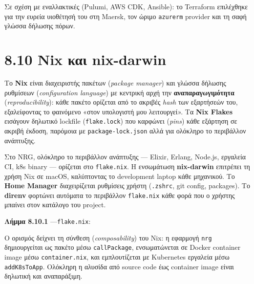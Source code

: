 Σε σχέση με εναλλακτικές (Pulumi, AWS CDK, Ansible): το Terraform
επιλέχθηκε για την ευρεία υιοθέτησή του στη Maersk, τον ώριμο
\texttt{azurerm} provider και τη σαφή γλώσσα δήλωσης πόρων.

\section{8.10 Nix και nix-darwin}\label{nix-ux3baux3b1ux3b9-nix-darwin}

Το \textbf{Nix} είναι διαχειριστής πακέτων (\emph{package manager}) και
γλώσσα δήλωσης ρυθμίσεων (\emph{configuration language}) με κεντρική
αρχή την \textbf{αναπαραγωγιμότητα} (\emph{reproducibility}): κάθε
πακέτο ορίζεται από το ακριβές \emph{hash} των εξαρτήσεών του,
εξαλείφοντας το φαινόμενο «στον υπολογιστή μου λειτουργεί». Τα
\textbf{Nix Flakes} εισάγουν δηλωτικό lockfile (\texttt{flake.lock}) που
καρφώνει (\emph{pins}) κάθε εξάρτηση σε ακριβή έκδοση, παρόμοια με
\texttt{package-lock.json} αλλά για ολόκληρο το περιβάλλον ανάπτυξης.

Στο NRG, ολόκληρο το περιβάλλον ανάπτυξης --- Elixir, Erlang, Node.js,
εργαλεία CI, k8s binary --- ορίζεται στο \texttt{flake.nix}. Η
ενσωμάτωση \textbf{nix-darwin} επιτρέπει τη χρήση Nix σε macOS,
καλύπτοντας το development laptop κάθε μηχανικού. Το \textbf{Home
Manager} διαχειρίζεται ρυθμίσεις χρήστη (\texttt{.zshrc}, git config,
packages). Το \textbf{direnv} φορτώνει αυτόματα το περιβάλλον
\texttt{flake.nix} κάθε φορά που ο χρήστης μπαίνει στον κατάλογο του
project.

\textbf{Λήμμα 8.10.1} ---\texttt{flake.nix}:

\begin{Shaded}
\begin{Highlighting}[]
\OperatorTok{\{}
   \OperatorTok{=} \OperatorTok{\{} \OperatorTok{\};}
   \OperatorTok{=} \OperatorTok{(}\OperatorTok{)} \OperatorTok{\{}
     \OperatorTok{=} \OperatorTok{[}\OperatorTok{];}
  \OperatorTok{\};}
\OperatorTok{\}}\NormalTok{;}
\end{Highlighting}
\end{Shaded}

Ο ορισμός δείχνει τη σύνθεση (\emph{composability}) του Nix: η εφαρμογή
\texttt{nrg} δημιουργείται ως πακέτο μέσω \texttt{callPackage},
ενσωματώνεται σε Docker container image μέσω \texttt{container.nix}, και
εμπλουτίζεται με Kubernetes εργαλεία μέσω \texttt{addK8sToApp}. Ολόκληρη
η αλυσίδα από source code έως container image είναι δηλωτική και
αναπαράξιμη.

